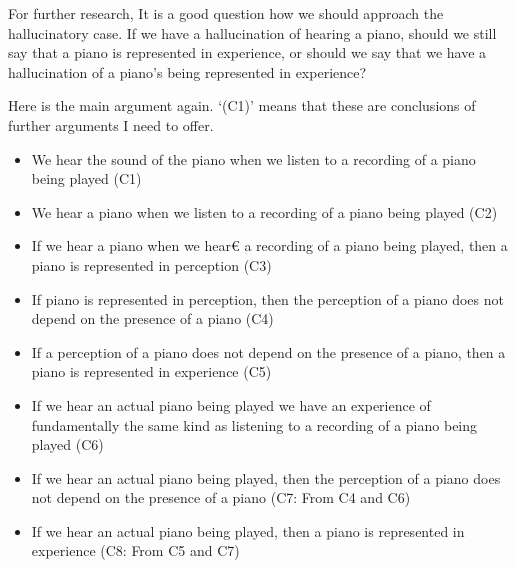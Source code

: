 \documentclass[sloppy, journal, git, bytitle, dodraft]{humapap}
\begin{document}
For further research, It is a good question how we should approach the hallucinatory case. If we have a hallucination of hearing a piano, should we still say that a piano is represented in experience, or should we say that we have a hallucination of a piano's being represented in experience? 


Here is the main argument again. `(C1)' means that these are conclusions of further arguments I need to offer.

\begin{itemize}
	\item We hear the sound of the piano when we listen to a recording of a piano being played (C1)
	\item We hear a piano when we listen to a recording of a piano being played (C2)
	\item If we hear a piano when we hear€ a recording of a piano being played, then a piano is represented in perception (C3)
	\item If piano is represented in perception, then the perception of a piano does not depend on the presence of a piano (C4) 
	\item If a perception of a piano does not depend on the presence of a piano, then a piano is represented in experience (C5)
	\item If we hear an actual piano being played we have an experience of fundamentally the same kind as listening to a recording of a piano being played (C6)
	\item If we hear an actual piano being played, then the perception of a piano does not depend on the presence of a piano (C7: From C4 and C6)
	\item If we hear an actual piano being played, then a piano is represented in experience (C8: From C5 and C7)
\end{itemize}




\printbibliography
\end{document}
